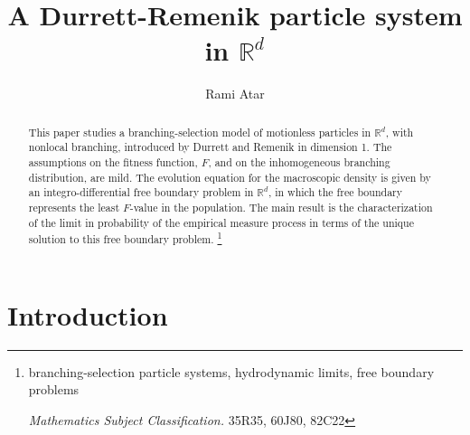 \documentclass[11pt]{amsart}
\theoremstyle{plain}
\newcommand{\R}{{\mathbb R}}
\begin{document}
\title{A Durrett-Remenik particle system in $\R^d$
}

\author{Rami Atar}
\address{\hspace{-1.3em}Viterbi Faculty of Electrical and Computer Engineering,
Technion -- Israel Isnstitute of Technology
{\rm August 19, 2025}
} 



\begin{abstract}
This paper studies a branching-selection model of motionless particles
in $\R^d$, with nonlocal branching,
introduced by Durrett and Remenik in dimension 1.
The assumptions on the fitness function, $F$, and on
the inhomogeneous branching distribution, are mild.
The evolution equation for the macroscopic density is given by an
integro-differential free boundary problem in $\R^d$,
in which the free boundary represents the least $F$-value in the population.
The main result is the characterization of
the limit in probability of the empirical measure process
in terms of the unique solution to this free boundary problem.
{\let\thefootnote\relax\footnote{{
\!
branching-selection particle systems,
hydrodynamic limits, free boundary problems

{\it Mathematics Subject Classification.}
35R35, 60J80, 82C22
}}}
\end{abstract}

\maketitle



\section{Introduction}
\end{document}
